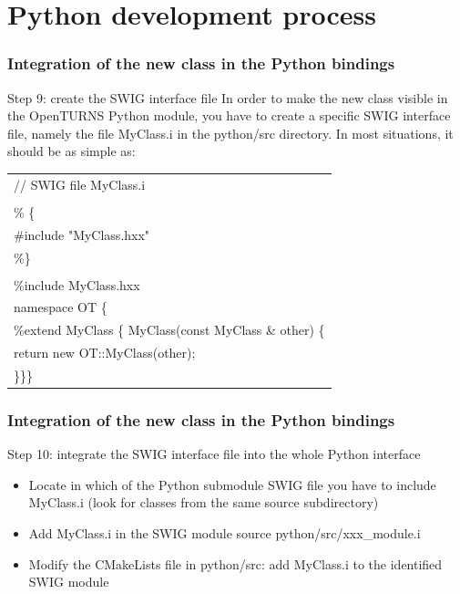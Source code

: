 \documentclass[8pt]{beamer}
\begin{document}
  
  
\section[Python development process]{Python development process}
\begin{frame}
  \frametitle{Integration of the new class in the Python bindings}
  \begin{block}{Step 9: create the SWIG interface file}
    In order to make the new class visible in the OpenTURNS Python module, you have to create a specific SWIG interface file, namely the file MyClass.i in the python/src directory. In most situations, it should be as simple as:
    \small
    \begin{tabular}{l}
      \ttfamily // SWIG file MyClass.i \\
      \ttfamily  \\
      \ttfamily \% \{ \\
      \ttfamily \#include "MyClass.hxx" \\
      \ttfamily \%\} \\
      \ttfamily  \\
      \ttfamily \%include MyClass.hxx \\
      \ttfamily namespace OT \{ \\
      \ttfamily \%extend MyClass \{ MyClass(const MyClass \& other) \{ \\
      \ttfamily return new OT::MyClass(other); \\
      \ttfamily \}\}\}
    \end{tabular}
    \normalsize
  \end{block}
\end{frame}
\begin{frame}
  \frametitle{Integration of the new class in the Python bindings}
  \begin{block}{Step 10: integrate the SWIG interface file into the whole Python interface}
    \begin{itemize}
    \item Locate in which of the Python submodule SWIG file you have to include MyClass.i (look for classes from the same source subdirectory) 
    \item Add MyClass.i in the SWIG module source python/src/xxx\_module.i
    \item Modify the CMakeLists file in python/src: add MyClass.i to the identified SWIG module
    \end{itemize}
  \end{block}
\end{frame}
\end{document}
